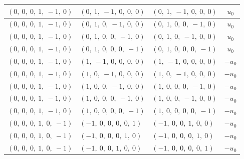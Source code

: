 \documentclass[11pt]{article}
\theoremstyle{definition}
\begin{document}
\begin{longtable}{|l|l|l|c|}
    \hline
    $\left( 0, \  0, \  0, \  1, \  -1, \  0\right)$ & $\left( 0, \  1, \  -1, \  0, \  0, \  0\right)$ & $\left( 0, \  1, \  -1, \  0, \  0, \  0\right)$ & $u_{0}$ \\
    \hline
    $\left( 0, \  0, \  0, \  1, \  -1, \  0\right)$ & $\left( 0, \  1, \  0, \  -1, \  0, \  0\right)$ & $\left( 0, \  1, \  0, \  0, \  -1, \  0\right)$ & $u_{0}$ \\
    \hline
    $\left( 0, \  0, \  0, \  1, \  -1, \  0\right)$ & $\left( 0, \  1, \  0, \  0, \  -1, \  0\right)$ & $\left( 0, \  1, \  0, \  -1, \  0, \  0\right)$ & $u_{0}$ \\
    \hline
    $\left( 0, \  0, \  0, \  1, \  -1, \  0\right)$ & $\left( 0, \  1, \  0, \  0, \  0, \  -1\right)$ & $\left( 0, \  1, \  0, \  0, \  0, \  -1\right)$ & $u_{0}$ \\
    \hline
    $\left( 0, \  0, \  0, \  1, \  -1, \  0\right)$ & $\left( 1, \  -1, \  0, \  0, \  0, \  0\right)$ & $\left( 1, \  -1, \  0, \  0, \  0, \  0\right)$ & $- u_{0}$ \\
    \hline
    $\left( 0, \  0, \  0, \  1, \  -1, \  0\right)$ & $\left( 1, \  0, \  -1, \  0, \  0, \  0\right)$ & $\left( 1, \  0, \  -1, \  0, \  0, \  0\right)$ & $- u_{0}$ \\
    \hline
    $\left( 0, \  0, \  0, \  1, \  -1, \  0\right)$ & $\left( 1, \  0, \  0, \  -1, \  0, \  0\right)$ & $\left( 1, \  0, \  0, \  0, \  -1, \  0\right)$ & $- u_{0}$ \\
    \hline
    $\left( 0, \  0, \  0, \  1, \  -1, \  0\right)$ & $\left( 1, \  0, \  0, \  0, \  -1, \  0\right)$ & $\left( 1, \  0, \  0, \  -1, \  0, \  0\right)$ & $- u_{0}$ \\
    \hline
    $\left( 0, \  0, \  0, \  1, \  -1, \  0\right)$ & $\left( 1, \  0, \  0, \  0, \  0, \  -1\right)$ & $\left( 1, \  0, \  0, \  0, \  0, \  -1\right)$ & $- u_{0}$ \\
    \hline
    $\left( 0, \  0, \  0, \  1, \  0, \  -1\right)$ & $\left( -1, \  0, \  0, \  0, \  0, \  1\right)$ & $\left( -1, \  0, \  0, \  1, \  0, \  0\right)$ & $- u_{0}$ \\
    \hline
    $\left( 0, \  0, \  0, \  1, \  0, \  -1\right)$ & $\left( -1, \  0, \  0, \  0, \  1, \  0\right)$ & $\left( -1, \  0, \  0, \  0, \  1, \  0\right)$ & $- u_{0}$ \\
    \hline
    $\left( 0, \  0, \  0, \  1, \  0, \  -1\right)$ & $\left( -1, \  0, \  0, \  1, \  0, \  0\right)$ & $\left( -1, \  0, \  0, \  0, \  0, \  1\right)$ & $- u_{0}$ \\

\end{longtable}
\end{document}
